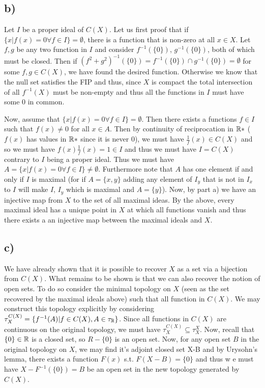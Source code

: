 \subsection*{b)}
Let $I$ be a proper ideal of $C(X)$. Let us first proof that if $\{ x | f(x) = 0 \forall f \in I \}=\emptyset$, there is a function that is non-zero at all $x\in X$. Let $f,g$ be any two function in $I$ and consider $f^{-1}(\{0\})$, $g^{-1}(\{0\})$, both of which must be closed. Then if $(f^2+g^2)^{-1}(\{0\})=f^{-1}(\{0\})\cap g^{-1}(\{0\})=\emptyset$ for some $f,g\in C(X)$, we have found the desired function. Otherwise we know that the null set satisfies the FIP and thus, since $X$ is compact the total intersection of all $f^{-1}(X)$ must be non-empty and thus all the functions in $I$ must have some $0$ in common. \par 
Now, assume that $\{ x | f(x) = 0 \forall f \in I \}=\emptyset$. Then there exists a functions $f\in I$ such that $f(x)\neq 0$ for all $x\in A$. Then by continuity of reciprocation in $\mathbb{R}*$ ($f(x)$ has values in $\mathbb{R}*$ since it is never $0$), we must have $\frac{1}{f}(x) \in C(X)$ and so we must have $f(x)\frac{1}{f}(x) = 1 \in I$ and thus we must have $I=C(X)$ contrary to $I$ being a proper ideal. Thus we must have $A=\{ x | f(x) = 0 \forall f \in I \}\neq\emptyset$. Furthermore note that $A$ has one element if and only if $I$ is maximal (for if $A=\{x,y\}$ adding any element of $I_y$ that is not in $I_x$ to $I$ will make $I$, $I_y$ which is maximal and $A=\{y\}$).
Now, by part a) we have an injective map from $X$ to the set of all maximal ideas. By the above, every maximal ideal has a unique point in $X$ at which all functions vanish and thus there exists a an injective map between the maximal ideals and $X$.
\subsection*{c)}
We have already shown that it is possible to recover $X$ as a set via a bijection from $C(X)$. What remains to be shown is that we can also recover the notion of open sets. To do so consider the minimal topology on $X$ (seen as the set recovered by the maximal ideals above) such that all function in $C(X)$. We may construct this topology explicitly by considering $\tau^{C(X)}_{X} = \{  f^{-1}(A) | f\in C(X), A\in \tau_{\mathbb{R}}\}$. Since all functions in $C(X)$ are continuous on the original topology, we must have $\tau^{C(X)}_{X} \subseteq \tau^{X}_X$. Now, recall that $\{0\} \in \mathbb{R}$ is a closed set, so $R-\{0\}$ is an open set. Now, for any open set $B$ in the original topology on $X$, we may find it's adjoint closed set X-B and by Urysohn's lemma, there exists a function $F(x)$ s.t. $F(X-B) = \{0\}$ and thus w	e must have $X-F^{-1}(\{0\}) = B$ be an open set in the new topology generated by $C(X)$. 

